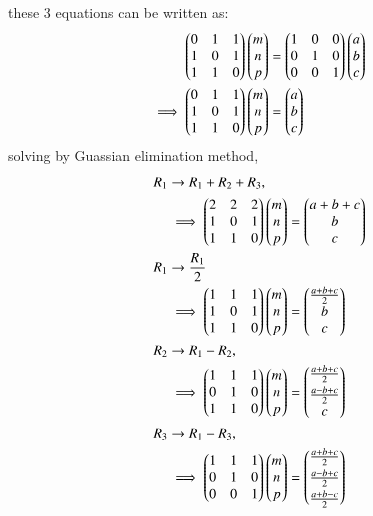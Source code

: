\documentclass[journal,12pt,twocolumn]{IEEEtran}
\theoremstyle{remark}
\begin{document}
these 3 equations can be written as:
\begin{align}
    \begin{pmatrix}0&1&1\\1&0&1\\1&1&0\end{pmatrix}\begin{pmatrix}m\\n\\p\end{pmatrix} &= \begin{pmatrix}1&0&0\\0&1&0\\0&0&1\end{pmatrix}\begin{pmatrix}a\\b\\c\end{pmatrix}\\
    \implies\begin{pmatrix}0&1&1\\1&0&1\\1&1&0\end{pmatrix}\begin{pmatrix}m\\n\\p\end{pmatrix} &= \begin{pmatrix}a\\b\\c\end{pmatrix}
\end{align}
solving by Guassian elimination method,
\begin{align}
    R_1 &\rightarrow R_1+R_2+R_3,\\
    &\implies\myvec{2&2&2\\1&0&1\\1&1&0}\myvec{m\\n\\p} = \myvec{a+b+c\\b\\c}\\
    R_1 &\rightarrow \frac{R_1}{2}\\
    &\implies\myvec{1&1&1\\1&0&1\\1&1&0}\myvec{m\\n\\p} = \myvec{\frac{a+b+c}{2}\\b\\c}\\
    R_2 &\rightarrow R_1-R_2,\\
    &\implies\myvec{1&1&1\\0&1&0\\1&1&0}\myvec{m\\n\\p} = \myvec{\frac{a+b+c}{2}\vspace{0.1cm}\\\frac{a-b+c}{2}\\c}\\
    R_3 &\rightarrow R_1-R_3,\\
    &\implies\myvec{1&1&1\\0&1&0\\0&0&1}\myvec{m\\n\\p} = \myvec{\frac{a+b+c}{2}\vspace{0.1cm}\\\frac{a-b+c}{2}\vspace{0.1cm}\\\frac{a+b-c}{2}}\\
\end{align}
\end{document}
